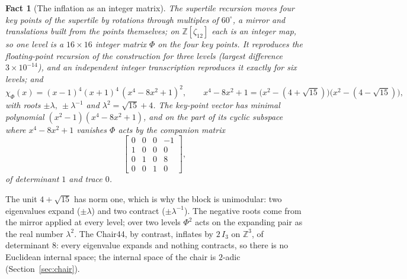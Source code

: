 \documentclass[11pt]{article}
\newtheorem{fact}{Fact}
\theoremstyle{definition}
\theoremstyle{remark}
\newcommand{\lam}{\lambda}
\begin{document}
\begin{fact}[The inflation as an integer matrix]
\label{fact:inflmat}
The supertile recursion moves four key points of the supertile by rotations through multiples of $60^{\circ}$, a mirror
and translations built from the points themselves; on $\mathbb{Z}[\zeta_{12}]$ each is an integer map, so one level is a
$16\times16$ integer matrix $\Phi$ on the four key points.  It reproduces the floating-point recursion of the construction
for three levels (largest difference $3\times10^{-14}$), and an independent integer transcription reproduces it exactly for six
levels; and
\[
\chi_{\Phi}(x)=(x-1)^{4}(x+1)^{4}\,(x^{4}-8x^{2}+1)^{2},\qquad
x^{4}-8x^{2}+1=\bigl(x^{2}-(4+\sqrt{15})\bigr)\bigl(x^{2}-(4-\sqrt{15})\bigr),
\]
with roots $\pm\lam,\ \pm\lam^{-1}$ and $\lam^{2}=\sqrt{15} + 4$.  The key-point vector has minimal polynomial
$(x^{2}-1)(x^{4}-8x^{2}+1)$, and on the part of its cyclic subspace where $x^{4}-8x^{2}+1$ vanishes $\Phi$ acts by the companion matrix
\[
\left[\begin{matrix}0 & 0 & 0 & -1\\1 & 0 & 0 & 0\\0 & 1 & 0 & 8\\0 & 0 & 1 & 0\end{matrix}\right] ,
\]
of determinant $1$ and trace $0$.
\end{fact}

\noindent
The unit $4+\sqrt{15}$ has norm one, which is why the block is unimodular: two eigenvalues expand ($\pm\lam$) and two
contract ($\pm\lam^{-1}$).  The negative roots come from the mirror applied at every level; over two levels $\Phi^{2}$
acts on the expanding pair as the real number $\lam^{2}$.  The Chair44, by contrast, inflates by $2\,I_{3}$ on
$\mathbb{Z}^{3}$, of determinant $8$: every eigenvalue expands and nothing contracts, so there is no Euclidean internal
space; the internal space of the chair is $2$-adic (Section~\ref{sec:chair}).
\end{document}
